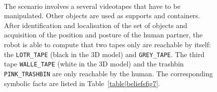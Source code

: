 \documentclass[preprint,3p,times]{elsarticle}
\newcommand{\concept}[1]{{\small \texttt{#1}}}
\begin{document}
\begin{figure}[ht!]
   \begin{center}
%
       \\ %
%
   \end{center}

   \caption{ The scenario involves a several videotapes that have to be
       manipulated. Other objects are used as supports and containers.  After
       identification and localisation of the set of objects and acquisition of
       the position and posture of the human partner, the robot is able to compute
       that two tapes only are reachable by itself: the \concept{LOTR\_TAPE}
       (black in the 3D model) and \concept{GREY\_TAPE}. The third tape
       \concept{WALLE\_TAPE} (white in the 3D model) and the trashbin
       \concept{PINK\_TRASHBIN} are only reachable by the human. The
       corresponding symbolic facts are listed in Table~\ref{table|beliefsfig7}.
   }%
 
 \label{fig:sparkSubfigures}

\end{figure}
\end{document}
